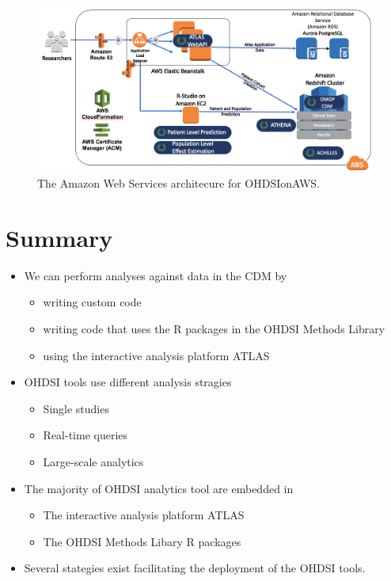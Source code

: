 \documentclass[11pt]{book}
\providecommand{\tightlist}{%
  \setlength{\itemsep}{0pt}\setlength{\parskip}{0pt}}
\theoremstyle{definition}
\theoremstyle{definition}
\theoremstyle{definition}
\theoremstyle{remark}
\let\BeginKnitrBlock\begin \let\EndKnitrBlock\end
\begin{document}
\begin{figure}

{\centering \includegraphics[width=1\linewidth]{images/OhdsiAnalyticsTools/OHDSIonAWSDiagram} 

}

\caption{The Amazon Web Services architecure for OHDSIonAWS.}\label{fig:ohdsionawsDiagram}
\end{figure}

\hypertarget{summary-5}{%
\section{Summary}\label{summary-5}}

\BeginKnitrBlock{rmdsummary}
\begin{itemize}
\tightlist
\item
  We can perform analyses against data in the CDM by

  \begin{itemize}
  \tightlist
  \item
    writing custom code
  \item
    writing code that uses the R packages in the OHDSI Methods Library
  \item
    using the interactive analysis platform ATLAS
  \end{itemize}
\item
  OHDSI tools use different analysis stragies

  \begin{itemize}
  \tightlist
  \item
    Single studies
  \item
    Real-time queries
  \item
    Large-scale analytics
  \end{itemize}
\item
  The majority of OHDSI analytics tool are embedded in

  \begin{itemize}
  \tightlist
  \item
    The interactive analysis platform ATLAS
  \item
    The OHDSI Methods Libary R packages
  \end{itemize}
\item
  Several stategies exist facilitating the deployment of the OHDSI tools.
\end{itemize}
\EndKnitrBlock{rmdsummary}
\end{document}
